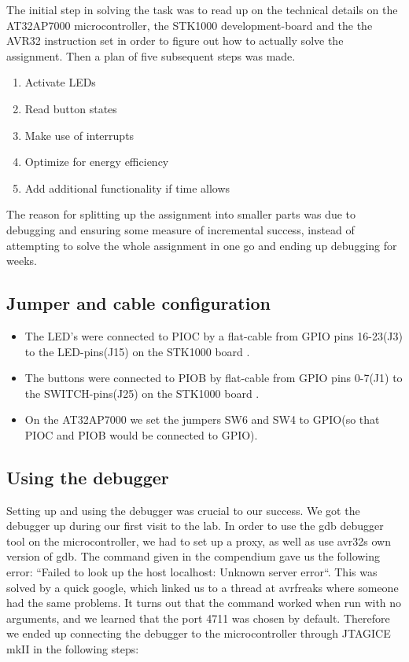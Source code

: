 The initial step in solving the task was to read up on the technical details on the AT32AP7000 microcontroller, the STK1000 development-board and the the AVR32 instruction set in order to figure out how to actually solve the assignment. Then a plan of five subsequent steps was made.

\begin{enumerate}
\item Activate LEDs
\item Read button states
\item Make use of interrupts
\item Optimize for energy efficiency
\item Add additional functionality if time allows
\end{enumerate}

The reason for splitting up the assignment into smaller parts was due to debugging and ensuring some measure of incremental success, instead of attempting to solve the whole assignment in one go and ending up debugging for weeks.
\subsection{Jumper and cable configuration}


\begin{itemize}
\item The LED’s were connected to PIOC by a flat-cable from GPIO pins 16-23(J3) to the LED-pins(J15) on the STK1000 board \cite[section~2.4.1]{compendium}. 
\item The buttons were connected to PIOB by flat-cable from GPIO pins 0-7(J1) to the SWITCH-pins(J25) on the STK1000 board \cite[section~2.4.1]{compendium}.
\item On the AT32AP7000 we set the jumpers SW6 and SW4 to GPIO(so that PIOC and PIOB would be connected to GPIO)\cite[table~2.3]{compendium}.
\end{itemize}

\subsection{Using the debugger}

Setting up and using the debugger was crucial to our success. We got the debugger up during our first visit to the lab. In order to use the gdb debugger tool on the microcontroller, we had to set up a proxy, as well as use avr32s own version of gdb. The command given in the compendium\cite{compendium} gave us the following error: “Failed to look up the host localhost: 
Unknown server error“. This was solved by a quick google, which linked us to a thread at avrfreaks\cite{gdbforum} where someone had the same problems. It turns out that the command worked when run with no arguments, and we learned that the port 4711 was chosen by default. Therefore we ended up connecting the debugger to the microcontroller through JTAGICE mkII in the following steps:\\

